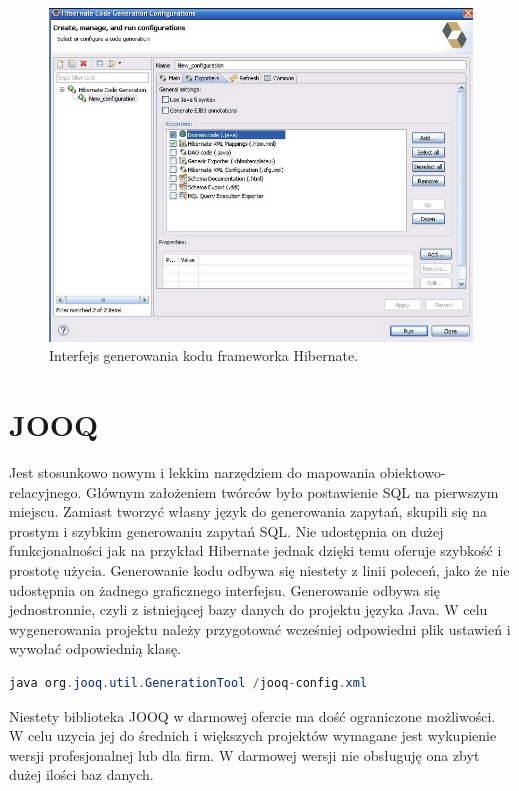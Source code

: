 \documentclass[12pt]{report}
\begin{document}
\begin{figure}[h]
	\centering
	\includegraphics[width=.67\textwidth]{images/eclipse.png}
	\caption{Interfejs generowania kodu frameworka Hibernate.}
\end{figure}

\FloatBarrier

\section{JOOQ}
Jest stosunkowo nowym i lekkim narzędziem do mapowania obiektowo-relacyjnego. Głównym założeniem twórców było postawienie SQL na pierwszym miejscu. Zamiast tworzyć własny język do generowania zapytań, skupili się na prostym i szybkim generowaniu zapytań SQL. Nie udostępnia on dużej funkcjonalności jak na przykład Hibernate jednak dzięki temu oferuje szybkość i prostotę użycia. Generowanie kodu odbywa się niestety z linii poleceń, jako że nie udostępnia on żadnego graficznego interfejsu. Generowanie odbywa się jednostronnie, czyli z istniejącej bazy danych do projektu języka Java. W celu wygenerowania projektu należy przygotować wcześniej odpowiedni plik ustawień i wywołać odpowiednią klasę.

\begin{framed}
\centering
\begin{lstlisting}[language=Java]
java org.jooq.util.GenerationTool /jooq-config.xml
\end{lstlisting}
\end{framed}

\FloatBarrier

Niestety biblioteka JOOQ w darmowej ofercie ma dość ograniczone możliwości. W celu uzycia jej do średnich i większych projektów wymagane jest wykupienie wersji profesjonalnej lub dla firm. W darmowej wersji nie obsługuję ona zbyt dużej ilości baz danych.
\end{document}
